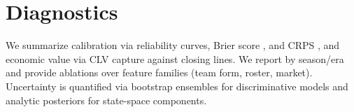 


\section{Diagnostics}
We summarize calibration via reliability curves, Brier score \citep{brier1950}, and CRPS \citep{gneiting2007}, and economic value via CLV capture against closing lines. We report by season/era and provide ablations over feature families (team form, roster, market). Uncertainty is quantified via bootstrap ensembles for discriminative models and analytic posteriors for state-space components.

